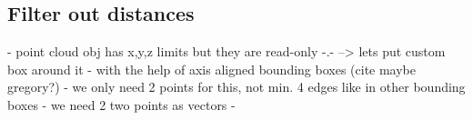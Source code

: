 \subsection{Filter out distances}
- point cloud obj has x,y,z limits but they are read-only -.-
--> lets put custom box around it
- with the help of axis aligned bounding boxes (cite maybe gregory?)
- we only need 2 points for this, not min. 4 edges like in other bounding boxes
- we need 2 two points as vectors
- 
